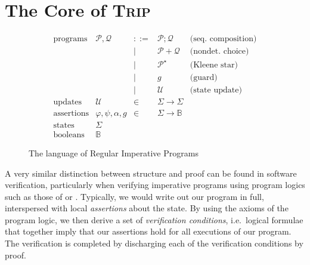 \documentclass[sigplan,review]{acmart}\settopmatter{printfolios=true,printccs=false,printacmref=false}
\begin{document}
\section{The Core of \textsc{Trip}}\label{sec:core}
\begin{figure}
  $$
  \begin{array}{llclr}
   \text{programs}& \mathcal{P},\mathcal{Q} & ::= & \mathcal{P} ; \mathcal{Q} & \text{(seq. composition)} \\ 
                  &          &  |  & \mathcal{P} + \mathcal{Q} & \text{(nondet. choice)} \\
                  &          &  |  & \mathcal{P}^\star & \text{(Kleene star)} \\
                  &          &  |  & g & \text{(guard)} \\
                  &          &  |  & \mathcal{U} & \text{(state update)} \\
    \text{updates} & \mathcal{U} & \in & \Sigma \rightarrow \Sigma \\ 
    \text{assertions} & \varphi,\psi, \alpha, g  & \in & \Sigma \rightarrow \mathbb{B} \\ 
    \text{states} & \Sigma \\
    \text{booleans} & \mathbb{B}
  \end{array}
  $$
  \caption{The language of Regular Imperative Programs}
  \label{fig:rip}
\end{figure}
A very similar distinction between structure and proof can be found in software verification, 
particularly when verifying imperative programs using program logics such as those of 
\citet{floyd} or \citet{hoare}. Typically, we would write out our program in full, 
interspersed with local \emph{assertions} about the state. By using the axioms of the program logic, 
we then derive a set of \emph{verification conditions}, i.e.\ logical formulae that together imply that 
our assertions hold for all executions of our program. The verification is completed 
by discharging each of the verification conditions by proof.
\end{document}
